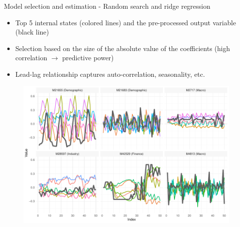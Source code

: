 \documentclass[aspectratio=169]{beamer}
\begin{document}
\begin{frame}[t]{Model selection and estimation - Random search and ridge regression}
    \begin{minipage}[t]{0.3\textwidth}
        \vspace{0pt}
        \begin{itemize}
            \item Top 5 internal states (colored lines) and the pre-processed output variable (black line)
			\item Selection based on the size of the absolute value of the coefficients (high correlation $\rightarrow$ predictive power)
			\item Lead-lag relationship captures auto-correlation, seasonality, etc.
        \end{itemize}
    \end{minipage}%
    \hfill
    \begin{minipage}[t]{0.7\textwidth}
        \vspace{0pt}
 		\begin{figure}[H]
		\center
			\includegraphics[scale=0.7]{figures/figure_06_model_states_top_wide.pdf}
		\end{figure}
    \end{minipage}
\end{frame}
\end{document}
